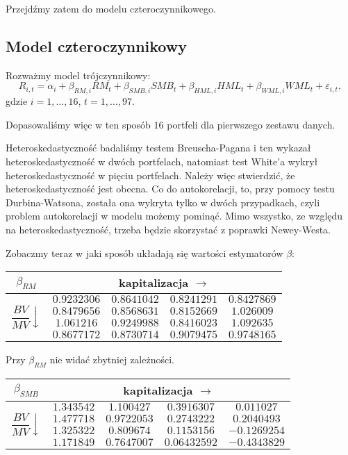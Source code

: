 \documentclass[11pt,a4paper]{report}
\begin{document}
\bigskip

Przejdźmy zatem do modelu czteroczynnikowego.

\subsection*{Model czteroczynnikowy}

Rozważmy model trójczynnikowy:
$$
R_{i,t}=\alpha_i + \beta_{RM,i}RM_t+ \beta_{SMB,i}SMB_t+ \beta_{HML,i}HML_t+\beta_{WML,i}WML_t+ \varepsilon_{i,t},
$$
gdzie $i=1,\ldots,16$, $t=1,\ldots,97$.

Dopasowaliśmy więc w ten sposób $16$ portfeli dla pierwszego zestawu danych.

Heteroskedastyczność badaliśmy testem Breuscha-Pagana i ten wykazał heteroskedastyczność w dwóch portfelach, natomiast test White'a wykrył heteroskedastyczność w pięciu portfelach. Należy więc stwierdzić, że heteroskedastyczność jest obecna. Co do autokorelacji, to, przy pomocy testu Durbina-Watsona, została ona wykryta tylko w dwóch przypadkach, czyli problem autokorelacji w modelu możemy pominąć. Mimo wszystko, ze względu na heteroskedastyczność, trzeba będzie skorzystać z poprawki Newey-Westa.  

Zobaczmy teraz w jaki sposób układają się wartości estymatorów $\beta$:

\bigskip

\begin{center}
\begin{tabular}{|c|c|c|c|c|}
\hline
$\beta_{RM}$ & \multicolumn{4}{|c|}{kapitalizacja $\longrightarrow$}  \\ \hline 
\multirow{4}{*}{$\dfrac{BV}{MV} \downarrow$} &  $ 0.9232306 $ & $ 0.8641042 $ & $ 0.8241291 $ & $ 0.8427869 $ \\ \cline{2-5}
 & $ 0.8479656 $ & $ 0.8568631 $ & $ 0.8152669 $ & $ 1.026009 $ \\ \cline{2-5}
 & $ 1.061216 $ & $ 0.9249988 $ & $ 0.8416023 $ & $ 1.092635 $ \\ \cline{2-5}
 & $ 0.8677172 $ & $ 0.8730714 $ & $ 0.9079475 $ & $ 0.9748165 $ \\ \hline
\end{tabular}
\end{center}

Przy $\beta_{RM}$ nie widać zbytniej zależności.

\begin{center}
\begin{tabular}{|c|c|c|c|c|}
\hline
$\beta_{SMB}$ & \multicolumn{4}{|c|}{kapitalizacja $\longrightarrow$}  \\ \hline 
\multirow{4}{*}{$\dfrac{BV}{MV} \downarrow$} &  $ 1.343542 $ & $ 1.100427 $ & $ 0.3916307 $ & $ 0.011027 $ \\ \cline{2-5}
 & $ 1.477718 $ & $ 0.9722053 $ & $ 0.2743222 $ & $ 0.2040493 $ \\ \cline{2-5}
 & $ 1.325322 $ & $ 0.809674 $ & $ 0.1153156 $ & $ -0.1269254 $ \\ \cline{2-5}
 & $ 1.171849 $ & $ 0.7647007 $ & $ 0.06432592 $ & $ -0.4343829 $ \\ \hline
\end{tabular}
\end{center}
\end{document}

